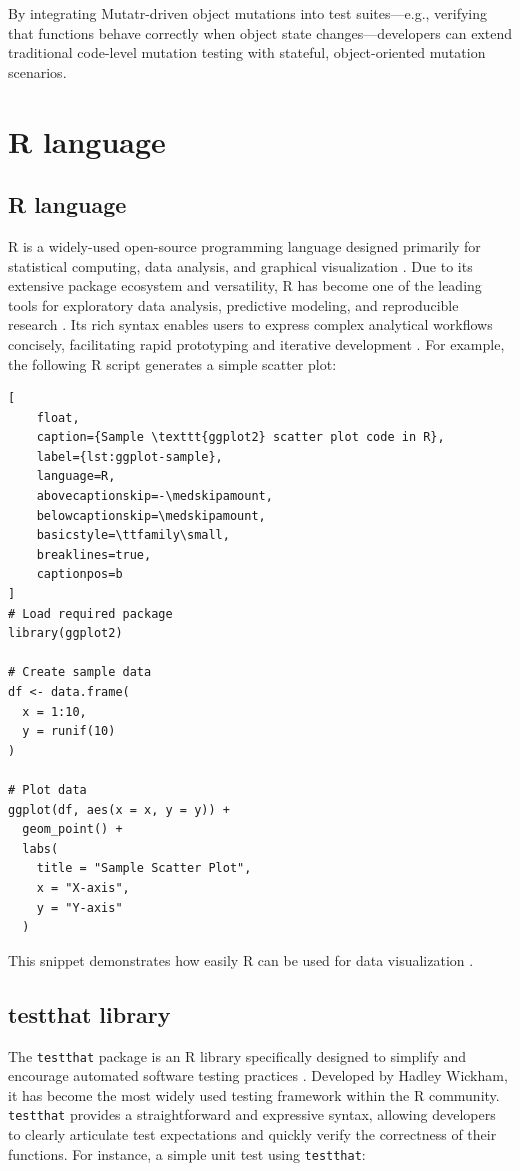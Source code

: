 By integrating Mutatr-driven object mutations into test suites—e.g., verifying that functions behave correctly when object state changes—developers can extend traditional code-level mutation testing with stateful, object-oriented mutation scenarios.

\section{R language}

\subsection{R language}

R is a widely-used open-source programming language designed primarily for statistical computing, data analysis, and graphical visualization \cite{R-base}. Due to its extensive package ecosystem and versatility, R has become one of the leading tools for exploratory data analysis, predictive modeling, and reproducible research \cite{wickham2014advanced}. Its rich syntax enables users to express complex analytical workflows concisely, facilitating rapid prototyping and iterative development \cite{wickham2019r4ds}. For example, the following R script generates a simple scatter plot:

\begin{lstlisting}[
    float,
    caption={Sample \texttt{ggplot2} scatter plot code in R},
    label={lst:ggplot-sample},
    language=R,
    abovecaptionskip=-\medskipamount,
    belowcaptionskip=\medskipamount,
    basicstyle=\ttfamily\small,
    breaklines=true,
    captionpos=b
]
# Load required package
library(ggplot2)

# Create sample data
df <- data.frame(
  x = 1:10,
  y = runif(10)
)

# Plot data
ggplot(df, aes(x = x, y = y)) +
  geom_point() +
  labs(
    title = "Sample Scatter Plot",
    x = "X-axis",
    y = "Y-axis"
  )
\end{lstlisting}


This snippet demonstrates how easily R can be used for data visualization \cite{wickham2019r4ds}.

\subsection{testthat library}

The \texttt{testthat} package is an R library specifically designed to simplify and encourage automated software testing practices \cite{wickham2011testthat}. Developed by Hadley Wickham, it has become the most widely used testing framework within the R community. \texttt{testthat} provides a straightforward and expressive syntax, allowing developers to clearly articulate test expectations and quickly verify the correctness of their functions. For instance, a simple unit test using \texttt{testthat}:

